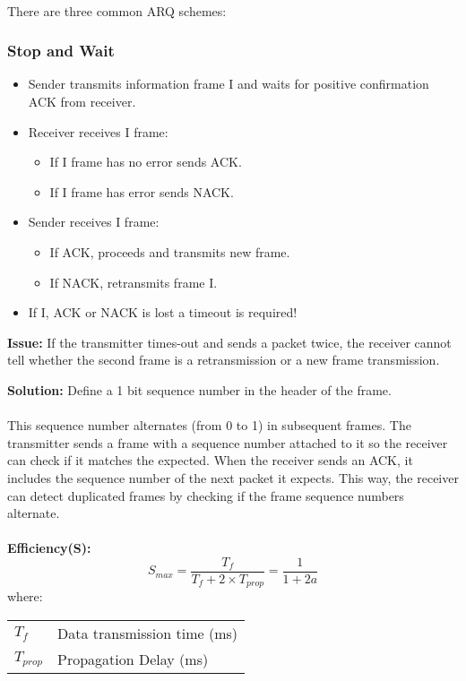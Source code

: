 \documentclass[../resumosRCOM.tex]{subfiles}
\makeatletter
\newenvironment{conditions}
  {\par\vspace{\abovedisplayskip}\noindent\begin{tabular}{>{$}l<{$} @{${}={}$} l}}
  {\end{tabular}\par\vspace{\belowdisplayskip}}
\makeatother
\begin{document}
\paragraph{}
There are three common ARQ schemes:

\subsubsection{Stop and Wait}
\begin{itemize}
    \item  Sender transmits information frame I and waits for positive confirmation
    ACK from receiver.
    \item Receiver receives I frame:
    \begin{itemize}
        \item If I frame has no error sends ACK.
        \item If I frame has error sends NACK.
    \end{itemize}
    \item Sender receives I frame:
    \begin{itemize}
        \item If ACK, proceeds and transmits new frame.
        \item If NACK, retransmits frame I.
    \end{itemize} 
    \item If I, ACK or NACK is lost a timeout is required!
\end{itemize}

\textbf{Issue:}
If the transmitter times-out and sends a packet twice, the receiver cannot tell 
whether the second frame is a retransmission or a new frame transmission.

\textbf{Solution:}
Define a 1 bit sequence number in the header of the frame.

\paragraph{}
This sequence number alternates (from 0 to 1) in subsequent frames. The transmitter sends
a frame with a sequence number attached to it so the receiver can check if it matches the 
expected.  When the receiver sends an ACK, it includes the sequence number of the next 
packet it expects.  This way, the receiver can detect duplicated frames by checking if the
frame sequence numbers alternate.

\paragraph{}
\textbf{Efficiency(S):}
\begin{equation}
    {S_{max}}=\frac{T_f}{T_f + 2 \times T_{prop}} = \frac{1}{1+2a}
\end{equation}
where:
\begin{conditions}
   T_f     &   Data transmission time (ms)\\
   T_{prop} &  Propagation Delay (ms)
\end{conditions}
\end{document}

